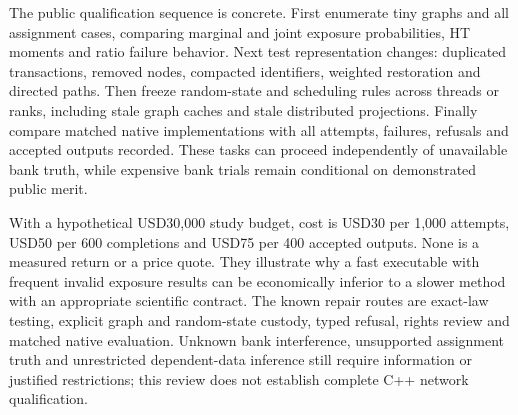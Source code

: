 The public qualification sequence is concrete. First enumerate tiny graphs and all assignment cases, comparing marginal and joint exposure probabilities, HT moments and ratio failure behavior. Next test representation changes: duplicated transactions, removed nodes, compacted identifiers, weighted restoration and directed paths. Then freeze random-state and scheduling rules across threads or ranks, including stale graph caches and stale distributed projections. Finally compare matched native implementations with all attempts, failures, refusals and accepted outputs recorded. These tasks can proceed independently of unavailable bank truth, while expensive bank trials remain conditional on demonstrated public merit.\citep{exec25_cnet_choice}

With a hypothetical USD30,000 study budget, cost is USD30 per 1,000 attempts, USD50 per 600 completions and USD75 per 400 accepted outputs. None is a measured return or a price quote. They illustrate why a fast executable with frequent invalid exposure results can be economically inferior to a slower method with an appropriate scientific contract. The known repair routes are exact-law testing, explicit graph and random-state custody, typed refusal, rights review and matched native evaluation. Unknown bank interference, unsupported assignment truth and unrestricted dependent-data inference still require information or justified restrictions; this review does not establish complete C++ network qualification.\citep{exec25_cnet_choice}
